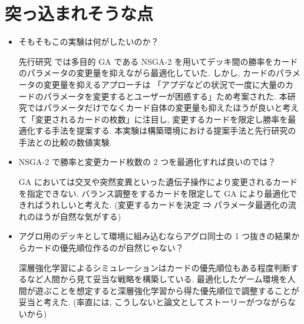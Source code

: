 \documentclass{jarticle}     %
\begin{document}
\section{突っ込まれそうな点}
\begin{itemize}
  \item そもそもこの実験は何がしたいのか？
  \par
  先行研究 \cite{DBLP:journals/corr/abs-1907-01623} では多目的 GA である NSGA-2 を用いてデッキ間の勝率をカードのパラメータの変更量を抑えながら最適化していた. しかし, カードのパラメータの変更量を抑えるアプローチは 「アプデなどの状況で一度に大量のカードのパラメータを変更するとユーザーが困惑する」ため考案された. 本研究ではパラメータだけでなくカード自体の変更量も抑えたほうが良いと考えて「変更されるカードの枚数」に注目し, 変更するカードを限定し勝率を最適化する手法を提案する. 本実験は構築環境における提案手法と先行研究の手法との比較の数値実験.
  \item NSGA-2 で勝率と変更カード枚数の 2 つを最適化すれば良いのでは？
  \par
  GA においては交叉や突然変異といった遺伝子操作により変更されるカードを指定できない. バランス調整をするカードを限定して GA により最適化できればうれしいと考えた. (変更するカードを決定 ⇒ パラメータ最適化の流れのほうが自然な気がする)  
  \item アグロ用のデッキとして環境に組み込むならアグロ同士の 1 つ抜きの結果からカードの優先順位作るのが自然じゃない？
  \par
  深層強化学習によるシミュレーションはカードの優先順位もある程度判断するなど人間から見て妥当な戦略を構築している. 最適化したゲーム環境を人間が遊ぶことを想定すると深層強化学習から得た優先順位で調整することが妥当と考えた. (率直には, こうしないと論文としてストーリーがつながらないから)
\end{itemize}
\end{document}
